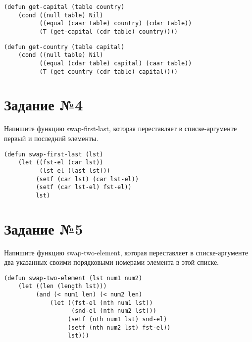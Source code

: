 \vspace{4mm}
\begin{minipage}{0.92\linewidth}
\begin{lstlisting}
(defun get-capital (table country)
    (cond ((null table) Nil)
          ((equal (caar table) country) (cdar table))
          (T (get-capital (cdr table) country))))
\end{lstlisting}
\end{minipage}

\vspace{4mm}
\begin{minipage}{0.92\linewidth}
\begin{lstlisting}
(defun get-country (table capital)
    (cond ((null table) Nil)
          ((equal (cdar table) capital) (caar table))
          (T (get-country (cdr table) capital))))
\end{lstlisting}
\end{minipage}

\section{Задание №4}

Напишите функцию swap-first-last, которая переставляет в списке-аргументе
первый и последний элементы.

\vspace{4mm}
\begin{minipage}{0.92\linewidth}
\begin{lstlisting}
(defun swap-first-last (lst)
    (let ((fst-el (car lst))
          (lst-el (last lst)))
         (setf (car lst) (car lst-el))
         (setf (car lst-el) fst-el))
         lst)
\end{lstlisting}
\end{minipage}

\section{Задание №5}

Напишите функцию swap-two-element, которая переставляет в списке-аргументе
два указанных своими порядковыми номерами элемента в этой списке.

\vspace{4mm}
\begin{minipage}{0.92\linewidth}
\begin{lstlisting}
(defun swap-two-element (lst num1 num2)
    (let ((len (length lst)))
         (and (< num1 len) (< num2 len)
             (let ((fst-el (nth num1 lst))
                   (snd-el (nth num2 lst)))
                  (setf (nth num1 lst) snd-el)
                  (setf (nth num2 lst) fst-el))
                  lst)))
\end{lstlisting}
\end{minipage}

